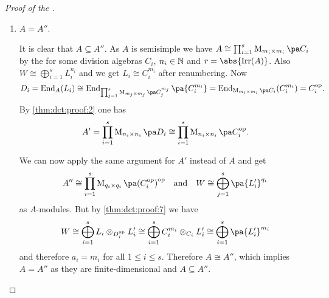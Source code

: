 \documentclass[12pt,a4paper]{scrartcl}
\theoremstyle{cplain}
\theoremstyle{cplain}
\theoremstyle{cplain}
\theoremstyle{definition}
\begin{document}
\begin{otherlanguage}{english}
\begin{proof}[Proof of the ]
\begin{enumerate}[label=\arabic*.]
    Now let $k$ be arbitrary. By \ref{thm:dct:proof:3} $L_i'$ is an irreducible $A'$-module on $\Mat{n_i}{D_i}$ (see \ref{thm:dct:proof:2} acts non-trivially. We get $L_i' \cong D_i^{n_i}$ as $\Mat{n_i}{D_i}$-modules. In particular one has $L_i\tp_{D_i^{\op}} D_i^{n_i} \cong L_i^{\oplus n_i}$ and we get $\dim (L_i \tp_{D_i^{\op}} D_i^{n_i} = n_i \dim L_i = \dim \Iso_{L_i}(W)$.
    
    We still have to show that $\Phi$ is an homomorphism of $A\tp A'$-modules. It suffices to show that the $\Phi_i$ are $A\tp A'$-module homomorphisms. Let $x_i \in L_i$, $f_i\in L_i'$, $a\in A$ and $b\in A'$. Then
    \begin{align*}
      \Phi_i(a.(x_i\tp f_i)) &= \Phi_i(ax_i \tp f_i) = f_i(ax_i) = af_i(x_i) = a.\Phi_i(x_i\tp f_i) \\ &= \Phi_i(b.(x_i\tp f_i)) = \Phi(x_i\tp bf_i) = (bf_i)(x_i) = b.f_i(x_i) \\&= b.\phi(x_i\tp f_i).
    \end{align*}
    \item $A = A''$.
    
    It is clear that $A \subseteq A''$. As $A$ is semisimple we have $A \cong \prod_{i=1}^s \Mat{m_i}{C_i}$ by the  for some division algebras $C_i$, $n_i \in\mathbb N$ and $r=\abs{\Irr(A)}$. Also $W \cong \bigoplus_{i=1}^sL_i^{n_i}$ and we get $L_i\cong C_i^{m_i}$ after renumbering. Now
    \begin{align*}
      D_i = \End_A(L_i) \cong \End_{\prod_{j=1}^s\Mat{m_j}{C_j^{m_j}}}\pa{C_i^{m_i}} = \End_{\Mat{m_i}{C_i}}(C_i^{m_i}) = C_i^{\op}.
    \end{align*}
    By \ref{thm:dct:proof:2} one has \[ A' = \prod_{i=1}^s \Mat{n_i}{D_i} \cong \prod_{i=1}^s\Mat{n_i}{C_i^{\op}}. \]
    
    We can now apply the same argument for $A'$ instead of $A$ and get \[ A'' \cong \prod_{i=1}^s\Mat{q_i}{{{(C_i^{\op})}^{\op}}}\quad\text{and}\quad W \cong \bigoplus_{j=1}^s \pa{L_i'}^{q_i} \] as $A$-modules. But by \ref{thm:dct:proof:7} we have \[ W \cong \bigoplus_{i=1}^sL_i\tp_{D_i^{\op}}L_i' \cong \bigoplus_{i=1}^s C_i^{m_i} \tp_{C_i}L_i' \cong \bigoplus_{i=1}^s\pa{L_i'}^{m_i} \] and therefore $a_i = m_i$ for all $1\le i\le s$. Therefore $A \cong A''$, which implies $A = A''$ as they are finite-dimensional and $A \subseteq A''$.
    \qedhere
  \end{enumerate}
\end{proof}



\end{otherlanguage}
\end{document}
